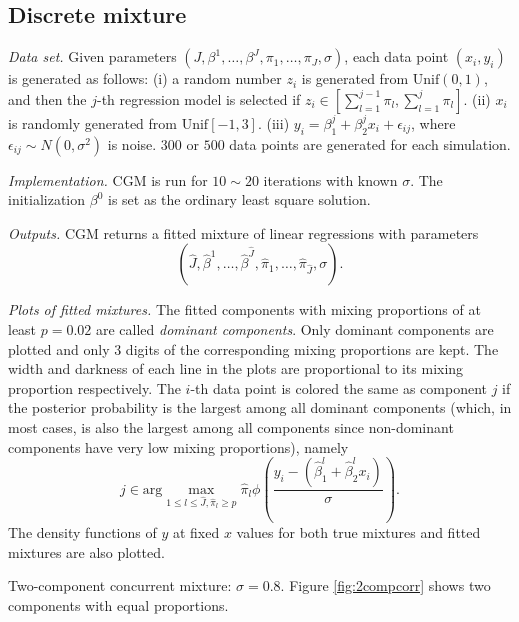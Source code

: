 \documentclass[11pt]{article}
\numberwithin{equation}{section}
\begin{document}
\subsection{Discrete mixture}
\label{section:discrete}

\emph{Data set.} Given parameters $(J,\beta^1,\dots,\beta^J,\pi_1,\dots,\pi_J,\sigma)$, each data point $(x_i,y_i)$ is generated as follows: (i) a random number $z_i$ is generated from $\mathrm{Unif}(0,1)$, and then the $j$-th regression model is selected if $z_i\in[\sum_{l=1}^{j-1} \pi_l,\sum_{l=1}^j \pi_l]$. (ii) $x_i$ is randomly generated from $\mathrm{Unif}[-1,3]$. (iii) $y_i=\beta^j_1 + \beta^j_2 x_i + \epsilon_{ij}$, where $\epsilon_{ij} \sim N(0,\sigma^2)$ is noise. $300$ or $500$ data points are generated for each simulation.

\emph{Implementation.} CGM is run for $10\sim 20$ iterations with known $\sigma$. The initialization $\beta^0$ is set as the ordinary least square solution. 

\emph{Outputs.} CGM returns a fitted mixture of linear regressions with parameters
\[
(\hat{J},\hat{\beta}^1,\dots,\hat{\beta}^{\hat{J}},\hat{\pi}_1,\dots,\hat{\pi}_{\hat{J}},\sigma).
\] 

\emph{Plots of fitted mixtures.} The fitted components with mixing proportions of at least $p =0.02$ are called \emph{dominant components}. Only dominant components are plotted and only 3 digits of the corresponding mixing proportions are kept. The width and darkness of each line in the plots are proportional to its mixing proportion respectively. The $i$-th data point is colored the same as component $j$ if the posterior probability is the largest among all dominant components (which, in most cases, is also the largest among all components since non-dominant components have very low mixing proportions), namely
\begin{equation}
j \in \mathrm{arg}\max_{1\leq l \leq \hat{J},\hat{\pi}_l \geq p} \hat{\pi}_l \phi\left(\frac{y_i-(\hat{\beta}^l_1+ \hat{\beta}^l_2x_i)}{\sigma} \right).
\end{equation}
The density functions of $y$ at fixed $x$ values for both true mixtures and fitted mixtures are also plotted.

 Two-component concurrent mixture: $\sigma = 0.8$.  Figure \ref{fig:2compcorr} shows two components with equal proportions.
\end{document}
